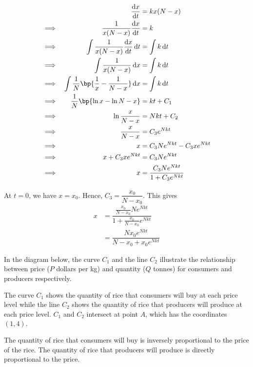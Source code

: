 \documentclass{echw}
\begin{document}
        \part
            {\allowdisplaybreaks
            \begin{alignat*}{2}
                && \der{x}{t} &= kx(N-x)\\
                \implies&& \dfrac{1}{x(N-x)} \der{x}{t} &= k\\
                \implies&& \int \dfrac{1}{x(N-x)} \der{x}{t} \d t &= \int k \d t\\
                \implies&& \int \dfrac{1}{x(N-x)} \d x &= \int k \d t\\
                \implies&& \int \dfrac1N \bp{\dfrac1x - \dfrac1{N-x}} \d x &= \int k \d t\\
                \implies&& \dfrac1{N} \bp{\ln x - \ln{N-x}} &= kt + C_1\\
                \implies&& \ln \dfrac{x}{N-x} &= Nkt + C_2\\
                \implies&& \dfrac{x}{N-x} &= C_3 e^{Nkt}\\
                \implies&& x &= C_3 N e^{Nkt} - C_3 xe^{Nkt}\\
                \implies&& x + C_3 xe^{Nkt} &= C_3 N e^{Nkt}\\
                \implies&& x &= \dfrac{C_3 Ne^{Nkt}}{1 + C_3 e^{Nkt}}
            \end{alignat*}}
            At $t = 0$, we have $x = x_0$. Hence, $C_3 = \dfrac{x_0}{N-x_0}$. This gives
            \begin{align*}
                x &= \dfrac{\frac{x_0}{N-x_0} Ne^{Nkt}}{1 + \frac{x_0}{N-x_0} e^{Nkt}}\\
                &= \dfrac{Nx_0 e^{Nkt}}{N-x_0 + x_0e^{Nkt}}
            \end{align*}


    \problem{}
        In the diagram below, the curve $C_1$ and the line $C_2$ illustrate the relationship between price ($P$ dollars per kg) and quantity ($Q$ tonnes) for consumers and producers respectively. 

        The curve $C_1$ shows the quantity of rice that consumers will buy at each price level while the line $C_2$ shows the quantity of rice that producers will produce at each price level. $C_1$ and $C_2$ intersect at point $A$, which has the coordinates $(1, 4)$.

        The quantity of rice that consumers will buy is inversely proportional to the price of the rice. The quantity of rice that producers will produce is directly proportional to the price.
\end{document}
